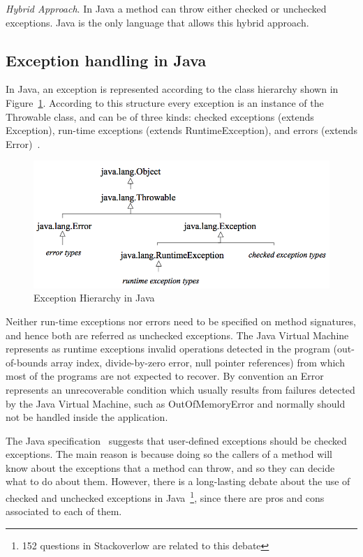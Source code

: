 \documentclass[conference]{IEEEtran}
\begin{document}
\noindent\emph{Hybrid Approach}. In Java a method can throw either checked or unchecked exceptions. Java is the only language that allows this hybrid approach.

\subsection{Exception handling in Java}
\label{sec:extypes}

In Java, an exception is represented according to the class hierarchy shown in Figure~\ref{fig:exchier}. 
According to this structure every exception is an instance of the Throwable class, and can be of three kinds: checked exceptions (extends Exception), run-time exceptions (extends RuntimeException), and errors (extends Error)~\cite{gosling2000java}. 

\begin{figure}
\centering
\includegraphics[width=\hsize]{new2_hierarchy.png}
\caption{Exception Hierarchy in Java}
\label{fig:exchier}
\end{figure}

Neither run-time exceptions nor errors need to be specified on method signatures, and hence both are referred as unchecked exceptions. The Java Virtual Machine represents as runtime exceptions invalid operations detected in the program (out-of-bounds array index, divide-by-zero error, null pointer references) from which most of the programs are not expected to recover. By convention an Error represents an unrecoverable condition which usually results from failures detected by the Java Virtual Machine, such as OutOfMemoryError and normally should not be handled inside the application. 

The Java specification~\cite{gosling2000java} suggests that user-defined exceptions should be checked exceptions. The main reason is because doing so the callers of a method will know about the exceptions that a method can throw, and so they can decide what to do about them. However, there is a long-lasting debate about the use of checked and unchecked exceptions in Java~\cite{javatut,stackoverlow,debate}\footnote{152 questions in Stackoverlow are related to this debate}, since there are pros and cons associated to each of them.
\end{document}
